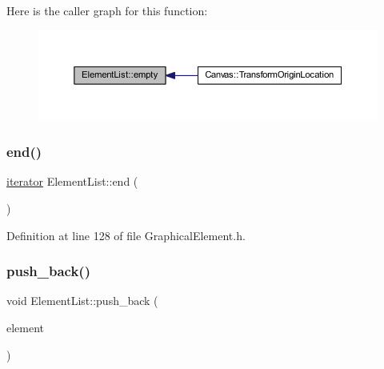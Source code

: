 Here is the caller graph for this function\+:
\nopagebreak
\begin{figure}[H]
\begin{center}
\leavevmode
\includegraphics[width=350pt]{class_element_list_aff93ee82e54aa171e792b0a86cafd08a_icgraph}
\end{center}
\end{figure}
\mbox{\label{class_element_list_a7e5dfdae6a16e385bbdd1564fd5cf200}} 
\subsubsection{\texorpdfstring{end()}{end()}}
{\footnotesize\ttfamily \hyperlink{class_element_list_a10e1b0c17ebe441fcd035fcf0a00d25e}{iterator} Element\+List\+::end (\begin{DoxyParamCaption}{ }\end{DoxyParamCaption})\hspace{0.3cm}{\ttfamily [inline]}}



Definition at line 128 of file Graphical\+Element.\+h.

\mbox{\label{class_element_list_a0c7327348fe7c7d8ad032ad4a71eed39}} 
\subsubsection{\texorpdfstring{push\+\_\+back()}{push\_back()}}
{\footnotesize\ttfamily void Element\+List\+::push\+\_\+back (\begin{DoxyParamCaption}\item[{\hyperlink{class_graphical_element}{Graphical\+Element} $\ast$}]{element }\end{DoxyParamCaption})\hspace{0.3cm}{\ttfamily [inline]}}



